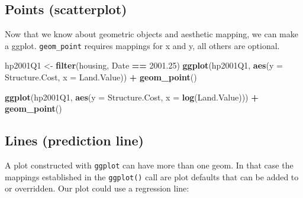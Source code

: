 \documentclass[]{book}
\newenvironment{Shaded}{\begin{snugshade}}{\end{snugshade}}
\newcommand{\KeywordTok}[1]{\textcolor[rgb]{0.13,0.29,0.53}{\textbf{#1}}}
\newcommand{\DataTypeTok}[1]{\textcolor[rgb]{0.13,0.29,0.53}{#1}}
\newcommand{\FloatTok}[1]{\textcolor[rgb]{0.00,0.00,0.81}{#1}}
\newcommand{\StringTok}[1]{\textcolor[rgb]{0.31,0.60,0.02}{#1}}
\newcommand{\OperatorTok}[1]{\textcolor[rgb]{0.81,0.36,0.00}{\textbf{#1}}}
\newcommand{\NormalTok}[1]{#1}
\begin{document}
\subsection{Points (scatterplot)}\label{points-scatterplot}

Now that we know about geometric objects and aesthetic mapping, we can
make a ggplot. \texttt{geom\_point} requires mappings for x and y, all
others are optional.

\begin{Shaded}
\begin{Highlighting}[]
\NormalTok{hp2001Q1 <-}\StringTok{ }\KeywordTok{filter}\NormalTok{(housing, Date }\OperatorTok{==}\StringTok{ }\FloatTok{2001.25}\NormalTok{) }
\KeywordTok{ggplot}\NormalTok{(hp2001Q1,}
       \KeywordTok{aes}\NormalTok{(}\DataTypeTok{y =}\NormalTok{ Structure.Cost, }\DataTypeTok{x =}\NormalTok{ Land.Value)) }\OperatorTok{+}
\StringTok{  }\KeywordTok{geom_point}\NormalTok{()}
\end{Highlighting}
\end{Shaded}

\begin{Shaded}
\begin{Highlighting}[]
\KeywordTok{ggplot}\NormalTok{(hp2001Q1,}
       \KeywordTok{aes}\NormalTok{(}\DataTypeTok{y =}\NormalTok{ Structure.Cost, }\DataTypeTok{x =} \KeywordTok{log}\NormalTok{(Land.Value))) }\OperatorTok{+}
\StringTok{  }\KeywordTok{geom_point}\NormalTok{()}
\end{Highlighting}
\end{Shaded}

\subsection{Lines (prediction line)}\label{lines-prediction-line}

A plot constructed with \texttt{ggplot} can have more than one geom. In
that case the mappings established in the \texttt{ggplot()} call are
plot defaults that can be added to or overridden. Our plot could use a
regression line:

\begin{Shaded}
\end{Shaded}
\end{document}
